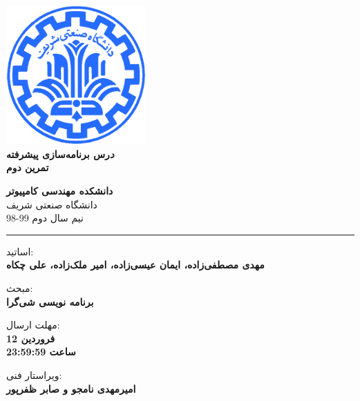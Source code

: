 \documentclass[]{article}
\begin{document}
\begin{titlepage}
\begin{center}
        
\vspace*{0.7cm}

\includegraphics[width=0.4\textwidth]{sharif1.png}\\
\vspace{0.5cm}
\textbf{ \Huge{\emph درس برنامه‌سازی پیشرفته} }\\
\vspace{0.5cm}
\textbf{ \Large{ تمرین دوم} }
\vspace{0.2cm}
       
 
      \large \textbf{دانشکده مهندسی کامپیوتر}\\\vspace{0.2cm}
    \large   دانشگاه صنعتی شریف\\\vspace{0.2cm}
       \large   ﻧﯿﻢ سال دوم 99-98 \\\vspace{0.2cm}
      \noindent\rule[1ex]{\linewidth}{1pt}
اساتید:\\
    \textbf{{مهدی مصطفی‌زاده، ایمان عیسی‌زاده، امیر ملک‌زاده، علی چکاه}}

    \vspace{0.20cm}
    مبحث:\\
    \textbf{{برنامه نویسی شی‌‌گرا}}

    \vspace{0.20cm}

   مهلت ارسال:\\
    \textbf{{12 فروردین}}\\
    \textbf{{ساعت 23:59:59}}

    \vspace{0.15cm}
ویراستار فنی:\\
    \textbf{{امیرمهدی نامجو و صابر ظفرپور}}
\end{center}
\end{titlepage}
\end{document}
